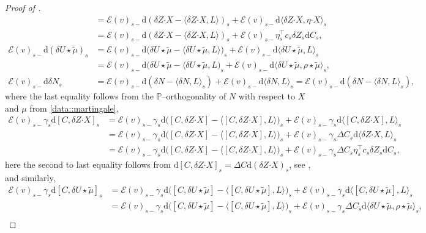 \documentclass[10pt]{article} %
\newcommand\cE{\mathcal E}
\def \P{\mathbb{P}}
\newcommand{\bcdot}{\boldsymbol{\cdot}}
\newcommand{\1}{\mathbf{1}}
\def\d{\mathrm{d}}
\begin{document}
\begin{proof}[Proof of ]
\begin{align*}
		&= \cE(v)_{s-}\d (\delta Z \bcdot X - \langle \delta Z \bcdot X,L \rangle)_s + \cE(v)_{s-}\d\langle \delta Z \bcdot X, \eta \bcdot X \rangle_s \\
		&= \cE(v)_{s-}\d (\delta Z \bcdot X - \langle \delta Z\bcdot X,L \rangle)_s + \cE(v)_{s-} \eta^\top_s c_s\delta Z_s \d C_s,\\
		\cE(v)_{s-}\d(\delta U \star \tilde\mu)_s &= \cE(v)_{s-}\d\big(\delta U \star \tilde\mu - \langle \delta U \star\tilde\mu,L\rangle\big)_s + \cE(v)_{s-}\d \langle \delta U \star\tilde\mu,L\rangle_s \\
		&= \cE(v)_{s-}\d\big(\delta U \star \tilde\mu - \langle \delta U \star\tilde\mu,L\big)_s + \cE(v)_{s-}\d \langle \delta U \star\tilde\mu,\rho\star\tilde\mu\rangle_s,\\
		\cE(v)_{s-}\d \delta N_s &= \cE(v)_{s-}\d(\delta N-\langle \delta N, L \rangle_s) + \cE(v)_{s-}\d\langle \delta N,L\rangle_s = \cE(v)_{s-}\d(\delta N-\langle \delta N, L \rangle_s),
	\end{align*}
	where the last equality follows from the $\P$--orthogonality of $N$ with respect to $X$ and $\mu$ from \ref{data::martingale},
	\begin{align*}
		\cE(v)_{s-}\gamma_s \d[C,\delta Z \bcdot X]_s 
		&= \cE(v)_{s-}\gamma_s \d\big([C,\delta Z \bcdot X]-\big\langle [C,\delta Z \bcdot X],L \big\rangle\big)_s + \cE(v)_{s-}\gamma_s \d\big\langle [C,\delta Z \bcdot X],L \big\rangle_s \\
		&= \cE(v)_{s-}\gamma_s \d\big([C,\delta Z \bcdot X]-\big\langle [C,\delta Z \bcdot X],L \big\rangle\big)_s + \cE(v)_{s-}\gamma_s \Delta C_s \d\langle \delta Z \bcdot X,L \rangle_s \\
		&= \cE(v)_{s-}\gamma_s \d\big([C,\delta Z \bcdot X]-\big\langle [C,\delta Z \bcdot X],L \big\rangle\big)_s + \cE(v)_{s-} \gamma_s \Delta C_s \eta_s^\top c_s \delta Z_s \d C_s,
	\end{align*}
	here the second to last equality follows from $\d [C,\delta Z \bcdot X]_s = \Delta C \d(\delta Z \bcdot X)_s$, see \cite[Proposition I.4.49]{jacod2003limit}, and similarly,
	\begin{align*}
		\cE(v)_{s-}\gamma_s \d[C,\delta U \star\tilde\mu]_s 
		&= \cE(v)_{s-}\gamma_s\d\big([C,\delta U \star\tilde\mu]-\big\langle [C,\delta U \star\tilde\mu],L \big\rangle\big)_s + \cE(v)_{s-} \gamma_s \d\big\langle [C,\delta U \star\tilde\mu],L \big\rangle_s \\
		&= \cE(v)_{s-}\gamma_s \d\big([C,\delta U \star\tilde\mu]-\big\langle [C,\delta U \star\tilde\mu],L \big\rangle\big)_s + \cE(v)_{s-}\gamma_s \Delta C_s \d\langle \delta U \star\tilde\mu,\rho\star\tilde\mu \rangle_s,\\

\end{align*}
\end{proof}
\end{document}
